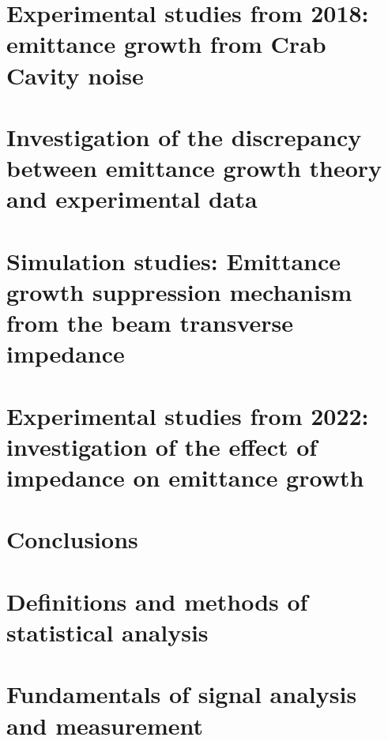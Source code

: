 \documentclass[12pt,twoside]{report} %
\begin{document}
\chapter{Experimental studies from 2018: emittance growth from Crab Cavity noise}\label{Ch:2018_analyisis}


%

\chapter{Investigation of the discrepancy between emittance growth theory and experimental data}\label{Ch:investigating_discrepancy}


\chapter{Simulation studies: Emittance growth suppression mechanism from the beam transverse impedance}\label{Ch:suppression_impedances}\label{Ch:suppression_impedance}


\chapter{Experimental studies from 2022: investigation of the effect of impedance on emittance growth}\label{Ch:experimental_CC_2022}


\chapter{Conclusions}


\printglossaries
\appendix
\chapter{Definitions and  methods of statistical analysis}\label{ch:app_A}

\chapter{Fundamentals of signal analysis and measurement}\label{ch:app_B}

\end{document}
